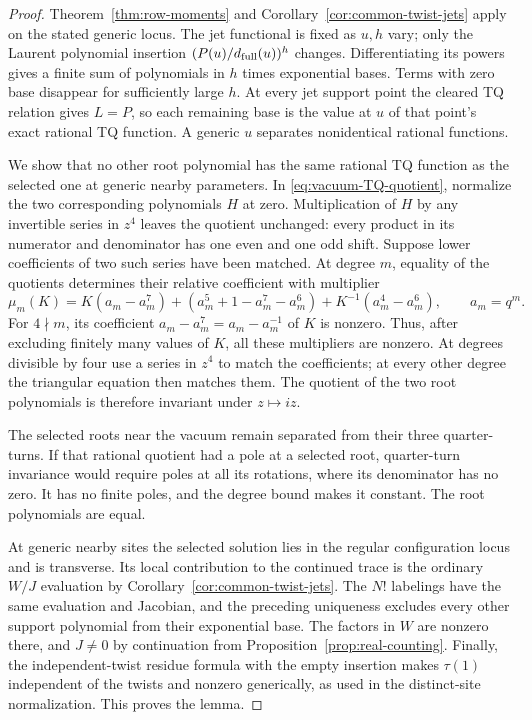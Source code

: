 \begin{proof}
Theorem~\ref{thm:row-moments} and Corollary~\ref{cor:common-twist-jets} apply on the stated generic locus. The jet functional is fixed as \(u,h\) vary; only the Laurent polynomial insertion \((P(u)/d_{\rm full}(u))^h\) changes. Differentiating its powers gives a finite sum of polynomials in \(h\) times exponential bases. Terms with zero base disappear for sufficiently large \(h\). At every jet support point the cleared TQ relation gives \(L=P\), so each remaining base is the value at \(u\) of that point's exact rational TQ function. A generic \(u\) separates nonidentical rational functions.

We show that no other root polynomial has the same rational TQ function as the selected one at generic nearby parameters. In \eqref{eq:vacuum-TQ-quotient}, normalize the two corresponding polynomials \(H\) at zero. Multiplication of \(H\) by any invertible series in \(z^4\) leaves the quotient unchanged: every product in its numerator and denominator has one even and one odd shift. Suppose lower coefficients of two such series have been matched. At degree \(m\), equality of the quotients determines their relative coefficient with multiplier
\[
 \mu_m(K)=
 K(a_m-a_m^7)+(a_m^5+1-a_m^7-a_m^6)
       +K^{-1}(a_m^4-a_m^6),\qquad a_m=q^m .
\]
For \(4\nmid m\), its coefficient \(a_m-a_m^7=a_m-a_m^{-1}\) of \(K\) is nonzero. Thus, after excluding finitely many values of \(K\), all these multipliers are nonzero. At degrees divisible by four use a series in \(z^4\) to match the coefficients; at every other degree the triangular equation then matches them. The quotient of the two root polynomials is therefore invariant under \(z\mapsto iz\).

The selected roots near the vacuum remain separated from their three quarter-turns. If that rational quotient had a pole at a selected root, quarter-turn invariance would require poles at all its rotations, where its denominator has no zero. It has no finite poles, and the degree bound makes it constant. The root polynomials are equal.

At generic nearby sites the selected solution lies in the regular configuration locus and is transverse. Its local contribution to the continued trace is the ordinary \(W/J\) evaluation by Corollary~\ref{cor:common-twist-jets}. The \(N!\) labelings have the same evaluation and Jacobian, and the preceding uniqueness excludes every other support polynomial from their exponential base. The factors in \(W\) are nonzero there, and \(J\ne0\) by continuation from Proposition~\ref{prop:real-counting}. Finally, the independent-twist residue formula with the empty insertion makes \(\tau(1)\) independent of the twists and nonzero generically, as used in the distinct-site normalization. This proves the lemma.
\end{proof}

